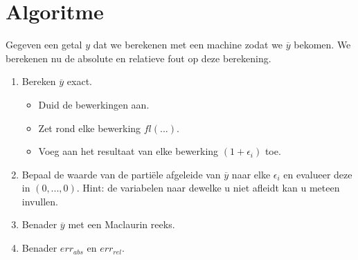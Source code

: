 \documentclass[12pt,a4paper]{article}
\begin{document}
\section{Algoritme}
Gegeven een getal $y$ dat we berekenen met een machine zodat we $\overline{y}$ bekomen. We berekenen nu de absolute en relatieve fout op deze berekening.
\begin{enumerate}
\item Bereken $\overline{y}$ exact.
\begin{itemize}
\item Duid de bewerkingen aan.
\item Zet rond elke bewerking $fl( ... )$.
\item Voeg aan het resultaat van elke bewerking $(1+\epsilon_i)$ toe.
\end{itemize}

\item Bepaal de waarde van de parti\"ele afgeleide van $\overline{y}$ naar elke $\epsilon_i$ en evalueer deze in $(0,...,0)$. Hint: de variabelen naar dewelke u niet afleidt kan u meteen invullen.

\item Benader $\overline{y}$ met een Maclaurin reeks.

\item Benader $err_{abs}$ en $err_{rel}$.
\end{enumerate}
\end{document}
